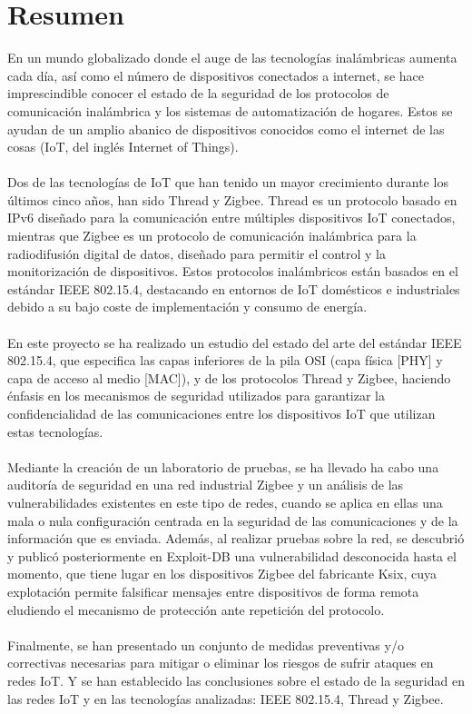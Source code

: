 \pagestyle{plain}
\chapter*{Resumen}
En un mundo globalizado donde el auge de las tecnologías inalámbricas aumenta cada día, así como el número de dispositivos conectados a internet, se hace imprescindible conocer el estado de la seguridad de los protocolos de comunicación inalámbrica y los sistemas de automatización de hogares. Estos se ayudan de un amplio abanico de dispositivos conocidos como el internet de las cosas (IoT, del inglés Internet of Things).
\\\\
Dos de las tecnologías de IoT que han tenido un mayor crecimiento durante los últimos cinco años, han sido Thread y Zigbee. Thread es un protocolo basado en IPv6 diseñado para la comunicación entre múltiples dispositivos IoT conectados, mientras que Zigbee es un protocolo de comunicación inalámbrica para la radiodifusión digital de datos, diseñado para permitir el control y la monitorización de dispositivos. Estos protocolos inalámbricos están basados en el estándar IEEE 802.15.4, destacando en entornos de IoT domésticos e industriales debido a su bajo coste de implementación y consumo de energía.
\\\\
En este proyecto se ha realizado un estudio del estado del arte del estándar IEEE 802.15.4, que especifica las capas inferiores de la pila OSI (capa física [PHY] y capa de acceso al medio [MAC]), y de los protocolos Thread y Zigbee, haciendo énfasis en los mecanismos de seguridad utilizados para garantizar la confidencialidad de las comunicaciones entre los dispositivos IoT que utilizan estas tecnologías.
\\\\
Mediante la creación de un laboratorio de pruebas, se ha llevado ha cabo una auditoría de seguridad en una red industrial Zigbee y un análisis de las vulnerabilidades existentes en este tipo de redes, cuando se aplica en ellas una mala o nula configuración centrada en la seguridad de las comunicaciones y de la información que es enviada. Además, al realizar pruebas sobre la red, se descubrió y publicó posteriormente en Exploit-DB una vulnerabilidad desconocida hasta el momento, que tiene lugar en los dispositivos Zigbee del fabricante Ksix, cuya explotación permite falsificar mensajes entre dispositivos de forma remota eludiendo el mecanismo de protección ante repetición del protocolo.
\\\\
Finalmente, se han presentado un conjunto de medidas preventivas y/o correctivas necesarias para mitigar o eliminar los riesgos de sufrir ataques en redes IoT. Y se han establecido las conclusiones sobre el estado de la seguridad en las redes IoT y en las tecnologías analizadas: IEEE 802.15.4, Thread y Zigbee.
